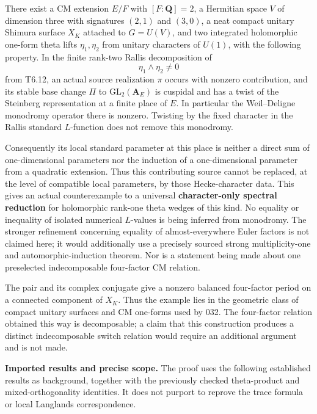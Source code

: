 There exist a CM extension \(E/F\) with \([F:\mathbf Q]=2\), a Hermitian space \(V\) of dimension three with signatures \((2,1)\) and \((3,0)\), a neat compact unitary Shimura surface \(X_K\) attached to \(G=U(V)\), and two integrated holomorphic one-form theta lifts \(\eta_1,\eta_2\) from unitary characters of \(U(1)\), with the following property. In the finite rank-two Rallis decomposition of \[
\eta_1\wedge\eta_2\ne0
\] from T6.12, an actual source realization \(\pi\) occurs with nonzero contribution, and its stable base change \(\Pi\) to \(\mathrm{GL}_2(\mathbf A_E)\) is cuspidal and has a twist of the Steinberg representation at a finite place of \(E\). In particular the Weil--Deligne monodromy operator there is nonzero. Twisting by the fixed character in the Rallis standard \(L\)-function does not remove this monodromy.

Consequently its local standard parameter at this place is neither a direct sum of one-dimensional parameters nor the induction of a one-dimensional parameter from a quadratic extension. Thus this contributing source cannot be replaced, at the level of compatible local parameters, by those Hecke-character data. This gives an actual counterexample to a universal \textbf{character-only spectral reduction} for holomorphic rank-one theta wedges of this kind. No equality or inequality of isolated numerical \(L\)-values is being inferred from monodromy. The stronger refinement concerning equality of almost-everywhere Euler factors is not claimed here; it would additionally use a precisely sourced strong multiplicity-one and automorphic-induction theorem. Nor is a statement being made about one preselected indecomposable four-factor CM relation.

The pair and its complex conjugate give a nonzero balanced four-factor period on a connected component of \(X_K\). Thus the example lies in the geometric class of compact unitary surfaces and CM one-forms used by 032. The four-factor relation obtained this way is decomposable; a claim that this construction produces a distinct indecomposable switch relation would require an additional argument and is not made.

\textbf{Imported results and precise scope.} The proof uses the following established results as background, together with the previously checked theta-product and mixed-orthogonality identities. It does not purport to reprove the trace formula or local Langlands correspondence.

